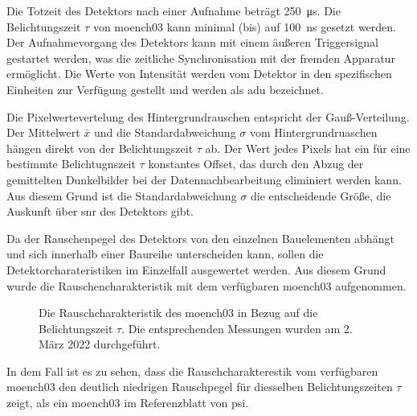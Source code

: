 \noindent
Die Totzeit des Detektors nach einer Aufnahme beträgt \SI{250}{\micro\second}. Die Belichtungszeit $\tau$ von \gls{moench03} kann minimal (bis) auf \SI{100}{\nano\second} gesetzt werden. Der Aufnahmevorgang des Detektors kann mit einem äußeren Triggersignal gestartet werden, was die zeitliche Synchronisation mit der fremden Apparatur ermöglicht. Die Werte von Intensität werden vom Detektor in den spezifischen Einheiten zur Verfügung gestellt und werden als \gls{adu} bezeichnet.

\noindent
Die Pixelwertevertelung des Hintergrundrauschen entspricht der Gauß-Verteilung. Der Mittelwert $\bar{x}$ und die Standardabweichung $\sigma$ vom Hintergrundruaschen hängen direkt von der Belichtungszeit $\tau$ ab. Der Wert jedes Pixels hat ein für eine bestimmte Belichtugnszeit $\tau$ konstantes Offset, das durch den Abzug der gemittelten Dunkelbilder bei der Datennachbearbeitung eliminiert werden kann. Aus diesem Grund ist die Standardabweichung $\sigma$ die entscheidende Größe, die Auskunft über \gls{snr} des Detektors gibt.

\noindent
Da der Rauschenpegel des Detektors von den einzelnen Bauelementen abhängt und sich innerhalb einer Baureihe unterscheiden kann, sollen die  Detektorcharateristiken im Einzelfall ausgewertet werden. Aus diesem Grund wurde die Rauschencharakteristik mit dem verfügbaren \gls{moench03} aufgenommen.
\begin{figure}[H]
    \centering
    
    \caption{Die Rauschcharakteristik des \gls{moench03} in Bezug auf die Belichtungszeit $\tau$. Die entsprechenden Messungen wurden am 2. März 2022 durchgeführt.}
    \label{fig:noise_moench}
\end{figure}
\noindent
In dem Fall ist es zu sehen, dass die Rauschcharakterestik vom verfügbaren \gls{moench03} den deutlich niedrigen Rauschpegel für diesselben Belichtungszeiten $\tau$ zeigt, als ein \gls{moench03} im Referenzblatt \cite{ramilli_measurements_2017} von \gls{psi}.

